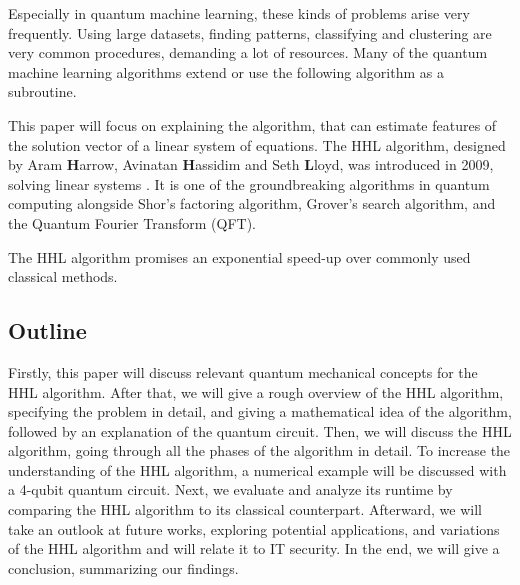 Especially in quantum machine learning, these kinds of problems arise very frequently. 
Using large datasets, finding patterns, classifying and clustering are very common procedures, demanding a lot of resources. 
Many of the quantum machine learning algorithms extend or use the following algorithm as a subroutine. 

This paper will focus on explaining the algorithm, that can estimate features of the solution vector of a linear system of equations.
The HHL algorithm, designed by Aram \textbf{H}arrow, Avinatan \textbf{H}assidim and Seth \textbf{L}loyd, was introduced in 2009, solving linear systems \cite{hhl}.
It is one of the groundbreaking algorithms in quantum computing alongside Shor's factoring algorithm, Grover's search algorithm, and the Quantum Fourier Transform (QFT).


The HHL algorithm promises an exponential speed-up over commonly used classical methods.

\subsection{Outline}
Firstly, this paper will discuss relevant quantum mechanical concepts for the HHL algorithm.
After that, we will give a rough overview of the HHL algorithm, specifying the problem in detail, and giving a mathematical idea of the algorithm, followed by an explanation of the quantum circuit.
Then, we will discuss the HHL algorithm, going through all the phases of the algorithm in detail. 
To increase the understanding of the HHL algorithm, a numerical example will be discussed with a 4-qubit quantum circuit.
Next, we evaluate and analyze its runtime by comparing the HHL algorithm to its classical counterpart. 
Afterward, we will take an outlook at future works, exploring potential applications, and variations of the HHL algorithm and will relate it to IT security. 
In the end, we will give a conclusion, summarizing our findings. 



